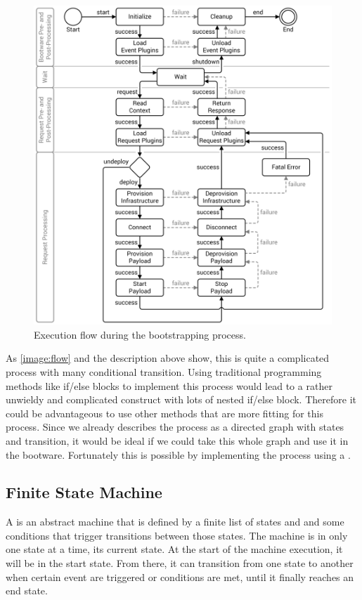 \begin{figure}[!htbp]
	\centering
	\includegraphics[resolution=600]{design/assets/flow}
	\caption{Execution flow during the bootstrapping process.}
	\label{image:flow}
\end{figure}

As \autoref{image:flow} and the description above show, this is quite a complicated process with many conditional transition.
Using traditional programming methods like if/else blocks to implement this process would lead to a rather unwieldy and complicated construct with lots of nested if/else block.
Therefore it could be advantageous to use other methods that are more fitting for this process.
Since we already describes the process as a directed graph with states and transition, it would be ideal if we could take this whole graph and use it in the bootware.
Fortunately this is possible by implementing the process using a .

\subsection{Finite State Machine}

A  is an abstract machine that is defined by a finite list of states and and some conditions that trigger transitions between those states.
The machine is in only one state at a time, its current state.
At the start of the machine execution, it will be in the start state.
From there, it can transition from one state to another when certain event are triggered or conditions are met, until it finally reaches an end state.
